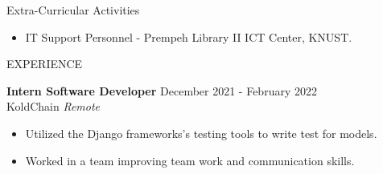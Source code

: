 \documentclass{resume} %
\begin{document}
\begin{rSection}{Extra-Curricular Activities} 
\begin{itemize}
    \item 	IT Support Personnel - Prempeh Library II ICT Center, KNUST.
\end{itemize}


\end{rSection}

\begin{rSection}{EXPERIENCE}

\textbf{Intern Software Developer} \hfill December 2021 - February 2022\\
KoldChain \hfill \textit{Remote}
 \begin{itemize}
    \itemsep -3pt {} 
     \item Utilized the Django frameworks's testing tools to write test for models.
     \item Worked in a team improving team work and communication skills.
 \end{itemize}
 

\end{rSection} 


\end{document}
